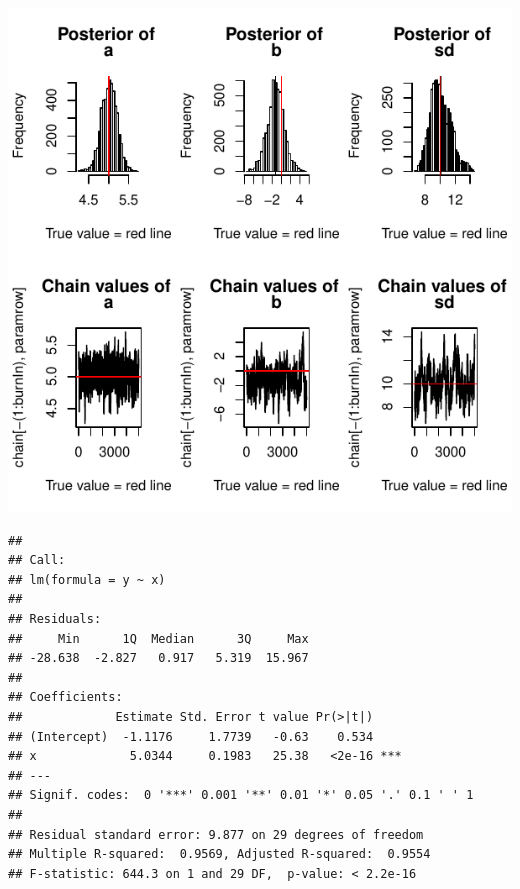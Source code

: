 \documentclass[a4paper,10pt]{article}\usepackage[]{graphicx}\usepackage[]{color}
\makeatletter
\def\maxwidth{ %
  \ifdim\Gin@nat@width>\linewidth
    \linewidth
  \else
    \Gin@nat@width
  \fi
}
\newenvironment{kframe}{%
 \def\at@end@of@kframe{}%
 \ifinner\ifhmode%
  \def\at@end@of@kframe{\end{minipage}}%
  \begin{minipage}{\columnwidth}%
 \fi\fi%
 \def\FrameCommand##1{\hskip\@totalleftmargin \hskip-\fboxsep
 \colorbox{shadecolor}{##1}\hskip-\fboxsep
     \hskip-\linewidth \hskip-\@totalleftmargin \hskip\columnwidth}%
 \MakeFramed {\advance\hsize-\width
   \@totalleftmargin\z@ \linewidth\hsize
   \@setminipage}}%
 {\par\unskip\endMakeFramed%
 \at@end@of@kframe}
\newenvironment{knitrout}{}{} %
\makeatother
\begin{document}
\begin{knitrout}
{}




{\centering \includegraphics[width=\maxwidth]{figure/setup_functions_and_parameters-3} 

}


\begin{kframe}\begin{verbatim}
## 
## Call:
## lm(formula = y ~ x)
## 
## Residuals:
##     Min      1Q  Median      3Q     Max 
## -28.638  -2.827   0.917   5.319  15.967 
## 
## Coefficients:
##             Estimate Std. Error t value Pr(>|t|)    
## (Intercept)  -1.1176     1.7739   -0.63    0.534    
## x             5.0344     0.1983   25.38   <2e-16 ***
## ---
## Signif. codes:  0 '***' 0.001 '**' 0.01 '*' 0.05 '.' 0.1 ' ' 1
## 
## Residual standard error: 9.877 on 29 degrees of freedom
## Multiple R-squared:  0.9569,	Adjusted R-squared:  0.9554 
## F-statistic: 644.3 on 1 and 29 DF,  p-value: < 2.2e-16
\end{verbatim}
\end{kframe}
\end{knitrout}
\end{document}
